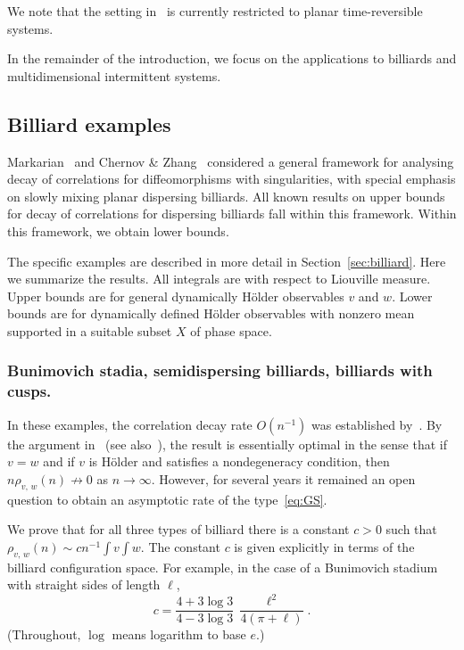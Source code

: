 \documentclass[AHL,Unicode,longabstracts,published]{cedram}
\begin{document}
\begin{rema}
We note that the setting in~\cite{VaientiZhangsub} is currently restricted to planar time-reversible systems.
\end{rema}


In the remainder of the introduction, we focus on the applications to billiards and multidimensional intermittent systems.



\subsection{Billiard examples}\label{sec:introbill}

Markarian~\cite{Markarian04} and Chernov \& Zhang~\cite{ChernovZhang05} considered a general framework for analysing decay of correlations for diffeomorphisms with singularities, with special emphasis on slowly mixing planar dispersing billiards. All known results on upper bounds for decay of correlations for dispersing billiards fall within this framework. Within this framework, we obtain lower bounds.

The specific examples are described in more detail in Section~\ref{sec:billiard}. Here we summarize the results. All integrals are with respect to Liouville measure. Upper bounds are for general dynamically H\"older observables $v$ and $w$. Lower bounds are for dynamically defined H\"older observables with nonzero mean supported in a suitable subset $X$ of phase space.


\subsubsection*{Bunimovich stadia, semidispersing billiards, billiards with cusps.}
In these examples, the correlation decay rate $O(n^{-1})$ was established by~\cite{ChernovMarkarian07,ChernovZhang05,ChernovZhang08,Markarian04}. By the argument in~\cite[Corollary~1.3]{BalintGouezel06} (see also~\cite[Corollary~1.1]{BalintChernovDolgopyat11}), the result is essentially optimal in the sense that if $v=w$ and if $v$ is H\"older and satisfies a nondegeneracy condition, then $n\rho_{v,\,w}(n)\not\to0$ as $n\to\infty$. However, for several years it remained an open question to obtain an asymptotic rate of the type~\eqref{eq:GS}.

We prove that for all three types of billiard there is a constant $c>0$ such that $\rho_{v,\,w}(n)\sim cn^{-1}\int v\int w$. The constant $c$ is given explicitly in terms of the billiard configuration space. For example, in the case of a Bunimovich stadium with straight sides of length $\ell$,
\[
c= \frac{4+3\log 3}{4-3\log 3}\,\frac{\ell^2}{4(\pi+\ell)}.
\]
(Throughout, $\log$ means logarithm to base $e$.)
\end{document}
